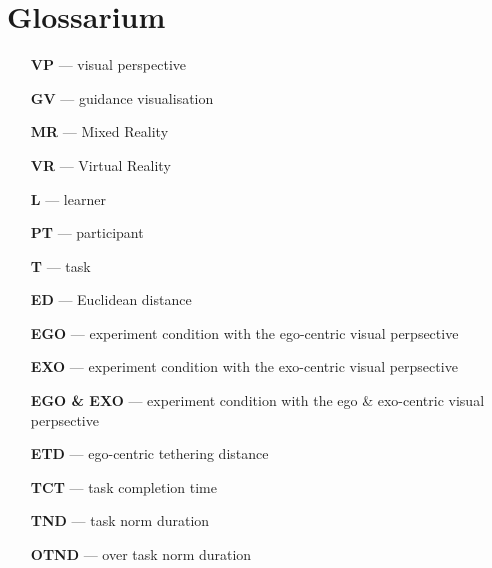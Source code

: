 \chapter{Glossarium}
\begin{itemize}
	\item[\textbf{VP}] --- visual perspective
	\item[\textbf{GV}] --- guidance visualisation 
	\item[\textbf{MR}] --- Mixed Reality
	\item[\textbf{VR}] --- Virtual Reality 
	\item[\textbf{L}] --- learner
	\item[\textbf{PT}] --- participant
	\item[\textbf{T}] --- task
	\item[\textbf{ED}] --- Euclidean distance
	\item[\textbf{EGO}] --- experiment condition with the ego-centric visual perpsective 
	\item[\textbf{EXO}] --- experiment condition with the exo-centric visual perpsective 
	\item[\textbf{EGO \& EXO}] --- experiment condition with the ego \& exo-centric visual perpsective 
	\item[\textbf{ETD}] --- ego-centric tethering distance
	\item[\textbf{TCT}] --- task completion time
	\item[\textbf{TND}] --- task norm duration
	\item[\textbf{OTND}] --- over task norm duration
\end{itemize}